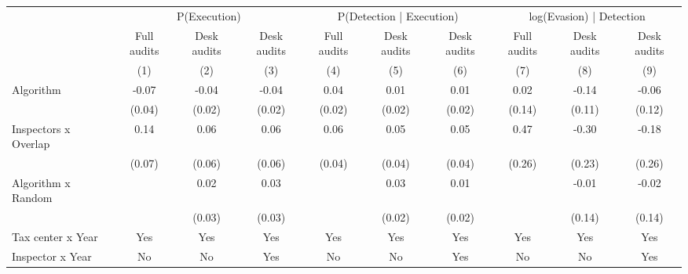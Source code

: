 \begin{tabular}{lccc|ccc|ccc} \toprule
\multicolumn{1}{l}{} & \multicolumn{3}{c}{P(Execution)} & \multicolumn{3}{c}{P(Detection | Execution)} & \multicolumn{3}{c}{log(Evasion) | Detection} \\\cmidrule(lr){2-4}\cmidrule(lr){5-7}\cmidrule(lr){8-10} \multicolumn{1}{l}{} & Full audits & Desk audits & Desk audits & Full audits & Desk audits & Desk audits & Full audits & Desk audits & Desk audits \\ \multicolumn{1}{l}{} & (1) & (2) & (3) & (4) & (5) & (6) & (7) & (8) & (9) \\ \midrule
Algorithm   &       -0.07\sym{*}  &       -0.04         &       -0.04         &        0.04\sym{**} &        0.01         &        0.01         &        0.02         &       -0.14         &       -0.06         \\
            &      (0.04)         &      (0.02)         &      (0.02)         &      (0.02)         &      (0.02)         &      (0.02)         &      (0.14)         &      (0.11)         &      (0.12)         \\
\addlinespace
Inspectors x Overlap&        0.14\sym{**} &        0.06         &        0.06         &        0.06\sym{*}  &        0.05         &        0.05         &        0.47\sym{*}  &       -0.30         &       -0.18         \\
            &      (0.07)         &      (0.06)         &      (0.06)         &      (0.04)         &      (0.04)         &      (0.04)         &      (0.26)         &      (0.23)         &      (0.26)         \\
\addlinespace
Algorithm x Random&                     &        0.02         &        0.03         &                     &        0.03         &        0.01         &                     &       -0.01         &       -0.02         \\
            &                     &      (0.03)         &      (0.03)         &                     &      (0.02)         &      (0.02)         &                     &      (0.14)         &      (0.14)         \\
\midrule
Tax center x Year&         Yes         &         Yes         &         Yes         &         Yes         &         Yes         &         Yes         &         Yes         &         Yes         &         Yes         \\
Inspector x Year&          No         &          No         &         Yes         &          No         &          No         &         Yes         &          No         &          No         &         Yes         \\

\end{tabular}
